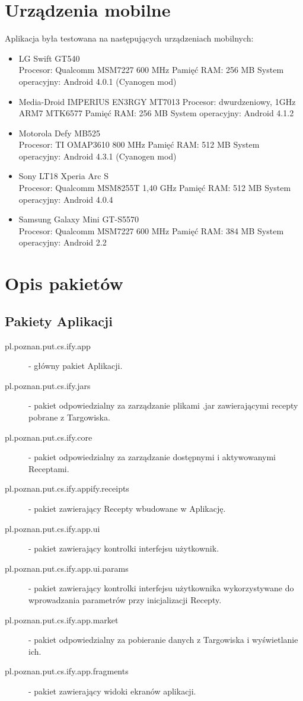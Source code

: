 \documentclass[11pt,a4paper,polish,thesis]{dcsbook}
\begin{document}
\section{Urządzenia mobilne}
Aplikacja była testowana na następujących urządzeniach mobilnych:
\begin{itemize}
\item{LG Swift GT540} \\
Procesor: Qualcomm MSM7227 600 MHz
Pamięć RAM: 256 MB
System operacyjny: Android 4.0.1 (Cyanogen mod)
\item{Media-Droid IMPERIUS EN3RGY MT7013}
Procesor: dwurdzeniowy, 1GHz ARM7 MTK6577
Pamięć RAM: 256 MB
System operacyjny: Android 4.1.2
\item{Motorola Defy MB525} \\
Procesor: TI OMAP3610 800 MHz
Pamięć RAM: 512 MB
System operacyjny: Android 4.3.1 (Cyanogen mod)
\item{Sony LT18 Xperia Arc S} \\
Procesor: Qualcomm MSM8255T 1,40 GHz
Pamięć RAM: 512 MB
System operacyjny: Android 4.0.4
\item{Samsung Galaxy Mini GT-S5570} \\
Procesor: Qualcomm MSM7227 600 MHz
Pamięć RAM: 384 MB
System operacyjny: Android 2.2
\end{itemize}

\section{Opis pakietów}
\subsection{Pakiety Aplikacji}
\begin{description}
\item[pl.poznan.put.cs.ify.app] - główny pakiet Aplikacji.
\item[pl.poznan.put.cs.ify.jars] - pakiet odpowiedzialny za zarządzanie plikami .jar zawierającymi recepty pobrane z Targowiska.
\item[pl.poznan.put.cs.ify.core] - pakiet odpowiedzialny za zarządzanie dostępnymi i aktywowanymi Receptami.
\item[pl.poznan.put.cs.ify.appify.receipts] - pakiet zawierający Recepty wbudowane w Aplikację.
\item[pl.poznan.put.cs.ify.app.ui] - pakiet zawierający kontrolki interfejsu użytkownik.
\item[pl.poznan.put.cs.ify.app.ui.params] - pakiet zawierający kontrolki interfejsu użytkownika wykorzystywane do wprowadzania parametrów przy inicjalizacji Recepty.
\item[pl.poznan.put.cs.ify.app.market] - pakiet odpowiedzialny za pobieranie danych z Targowiska i wyświetlanie ich.
\item[pl.poznan.put.cs.ify.app.fragments] - pakiet zawierający widoki ekranów aplikacji.
\end{description}
\end{document}
